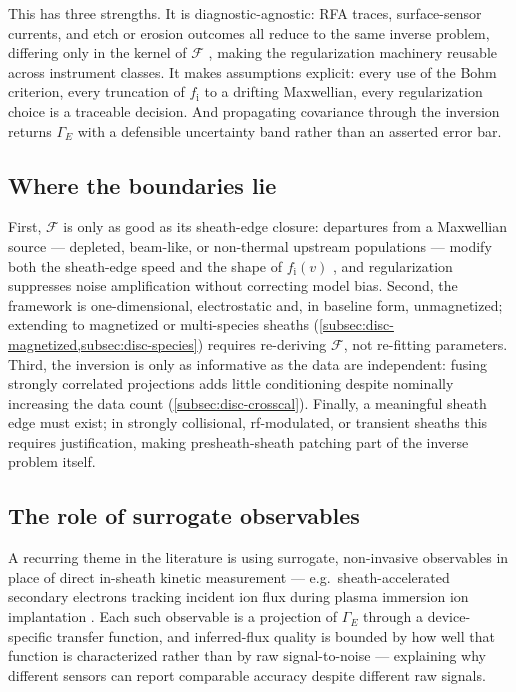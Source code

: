 This has three strengths. It is diagnostic-agnostic: RFA traces, surface-sensor currents, and etch or erosion outcomes all reduce to the same inverse problem, differing only in the kernel of $\mathcal{F}$ \cite{ref0074,ref0075}, making the regularization machinery reusable across instrument classes. It makes assumptions explicit: every use of the Bohm criterion, every truncation of $f_{\mathrm{i}}$ to a drifting Maxwellian, every regularization choice is a traceable decision. And propagating covariance through the inversion returns $\Gamma_{E}$ with a defensible uncertainty band rather than an asserted error bar.

\subsection{Where the boundaries lie}

First, $\mathcal{F}$ is only as good as its sheath-edge closure: departures from a Maxwellian source — depleted, beam-like, or non-thermal upstream populations — modify both the sheath-edge speed and the shape of $f_{\mathrm{i}}(v)$ \cite{ref0090}, and regularization suppresses noise amplification without correcting model bias. Second, the framework is one-dimensional, electrostatic and, in baseline form, unmagnetized; extending to magnetized or multi-species sheaths (\cref{subsec:disc-magnetized,subsec:disc-species}) requires re-deriving $\mathcal{F}$, not re-fitting parameters. Third, the inversion is only as informative as the data are independent: fusing strongly correlated projections adds little conditioning despite nominally increasing the data count (\cref{subsec:disc-crosscal}). Finally, a meaningful sheath edge must exist; in strongly collisional, rf-modulated, or transient sheaths this requires justification, making presheath-sheath patching part of the inverse problem itself.

\subsection{The role of surrogate observables}

A recurring theme in the literature is using surrogate, non-invasive observables in place of direct in-sheath kinetic measurement — e.g.\ sheath-accelerated secondary electrons tracking incident ion flux during plasma immersion ion implantation \cite{ref0078}. Each such observable is a projection of $\Gamma_{E}$ through a device-specific transfer function, and inferred-flux quality is bounded by how well that function is characterized rather than by raw signal-to-noise — explaining why different sensors can report comparable accuracy despite different raw signals.


